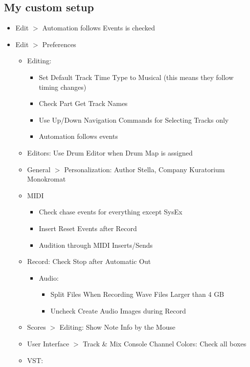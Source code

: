 \documentclass[10pt]{article}
\begin{document}
\subsection{My custom setup}\hypertarget{CustomSetup}{}

\begin{itemize}
	\item Edit $>$ Automation follows Events is checked
	\item Edit $>$ Preferences
	\begin{itemize}
		\item Editing:
		\begin{itemize}
			\item Set Default Track Time Type to Musical (this means they follow timing changes)
			\item Check Part Get Track Names
			\item Use Up/Down Navigation Commands for Selecting Tracks only
			\item Automation follows events
		\end{itemize}
		\item Editors: Use Drum Editor when Drum Map is assigned
		\item General $>$ Personalization: Author Stella, Company Kuratorium Monokromat
		\item MIDI
		\begin{itemize}
			\item Check chase events for everything except SysEx
			\item Insert Reset Events after Record
			\item Audition through MIDI Inserts/Sends
		\end{itemize}
		\item Record: Check Stop after Automatic  Out
		\begin{itemize}
			\item Audio:
			\begin{itemize}
				\item Split Files When Recording Wave Files Larger than 4 GB
				\item Uncheck Create Audio Images during Record
			\end{itemize}
		\end{itemize}
		\item Scores $>$ Editing: Show Note Info by the Mouse
		\item User Interface $>$ Track \& Mix Console Channel Colors: Check all boxes
		\item VST:
		\begin{itemize}

\end{itemize}
\end{itemize}
\end{itemize}
\end{document}

